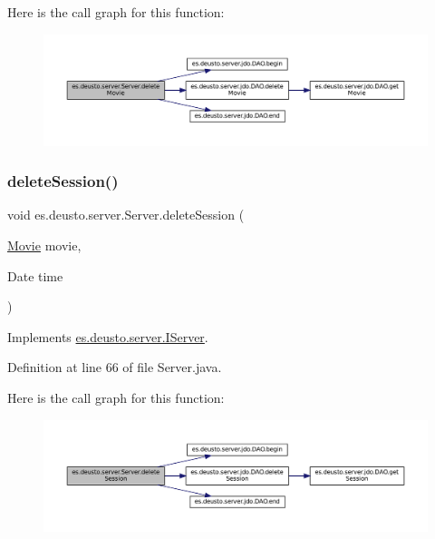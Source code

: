 Here is the call graph for this function\+:
\nopagebreak
\begin{figure}[H]
\begin{center}
\leavevmode
\includegraphics[width=350pt]{classes_1_1deusto_1_1server_1_1_server_a6501e4103fcc2ef691c15e4e02f7136c_cgraph}
\end{center}
\end{figure}
\mbox{\label{classes_1_1deusto_1_1server_1_1_server_aa5f1973de47331683592355aaa036bfb}} 
\subsubsection{\texorpdfstring{deleteSession()}{deleteSession()}}
{\footnotesize\ttfamily void es.\+deusto.\+server.\+Server.\+delete\+Session (\begin{DoxyParamCaption}\item[{\mbox{\hyperlink{classes_1_1deusto_1_1server_1_1jdo_1_1_movie}{Movie}}}]{movie,  }\item[{Date}]{time }\end{DoxyParamCaption})}



Implements \mbox{\hyperlink{interfacees_1_1deusto_1_1server_1_1_i_server_a83edabd700f0b02d4007c28392ec7c94}{es.\+deusto.\+server.\+I\+Server}}.



Definition at line 66 of file Server.\+java.

Here is the call graph for this function\+:
\nopagebreak
\begin{figure}[H]
\begin{center}
\leavevmode
\includegraphics[width=350pt]{classes_1_1deusto_1_1server_1_1_server_aa5f1973de47331683592355aaa036bfb_cgraph}
\end{center}
\end{figure}
\mbox{\label{classes_1_1deusto_1_1server_1_1_server_a7e4544c63bcf2b2d3abce0d2ff1567ac}} 
